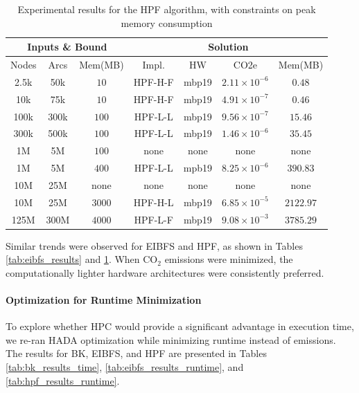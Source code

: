 \documentclass[a4paper,singleside,12pt]{report} %
\begin{document}
\begin{table}[h!]
    \centering
    \begin{tabular}{|ccc|cccc|}
        \hline
        \multicolumn{3}{|c|}{Inputs \& Bound} & \multicolumn{4}{c|}{Solution} \\
        \hline
        Nodes & Arcs & Mem(MB) & Impl. & HW & CO2e & Mem(MB) \\
        \hline
        2.5k & 50k & $10$ & HPF-H-F & mbp19 & $2.11 \times 10^{-6}$ & $0.48$ \\
        10k & 75k & $10$ & HPF-H-F & mbp19 & $4.91 \times 10^{-7}$ & $0.46$ \\
        100k & 300k & $100$ & HPF-L-L & mbp19 & $9.56 \times 10^{-7}$ & $15.46$ \\
        300k & 500k & $100$ & HPF-L-L & mbp19 & $1.46 \times 10^{-6}$ & $35.45$ \\
        1M & 5M & $100$ & none & none & none & none \\
        1M & 5M & $400$ & HPF-L-L & mpb19 & $8.25 \times 10^{-6}$ & $390.83$ \\
        10M & 25M & none & none & none & none & none \\
        10M & 25M & $3000$ & HPF-H-L & mbp19 & $6.85 \times 10^{-5}$ & $2122.97$ \\
        125M & 300M & $4000$ & HPF-L-F & mbp19 & $9.08 \times 10^{-3}$ & $3785.29$ \\
        \hline
    \end{tabular}
    \caption{Experimental results for the HPF algorithm, with constraints on peak memory consumption}
    \label{tab:hpf_results}
\end{table}

Similar trends were observed for EIBFS and HPF, as shown in Tables \ref{tab:eibfs_results} and \ref{tab:hpf_results}. When CO$_2$ emissions were minimized, the computationally
lighter hardware architectures were consistently preferred. 

\paragraph{Optimization for Runtime Minimization}

To explore whether HPC would provide a significant advantage in execution time, we re-ran HADA optimization while minimizing runtime instead of emissions. The results for BK, EIBFS, 
and HPF are presented in Tables \ref{tab:bk_results_time}, \ref{tab:eibfs_results_runtime}, and \ref{tab:hpf_results_runtime}.
\end{document}

